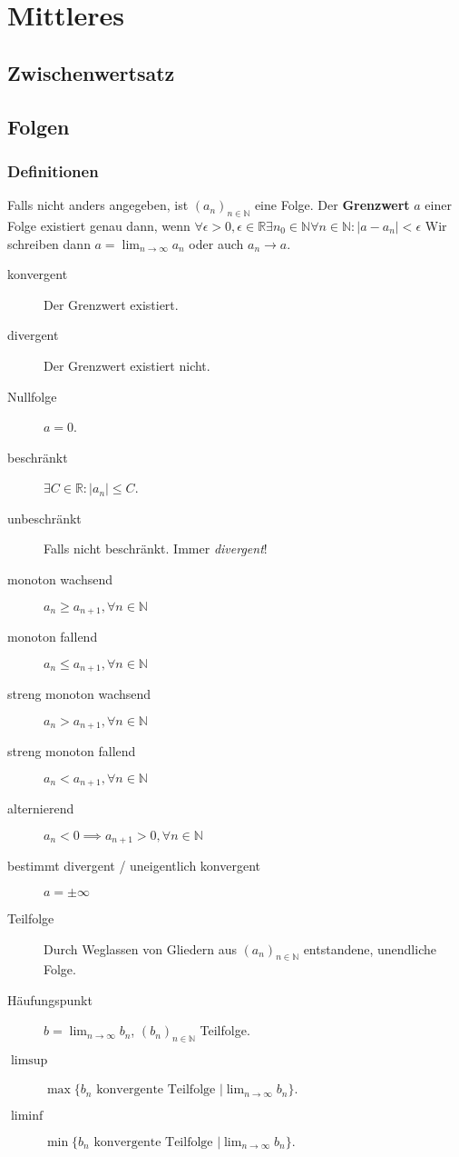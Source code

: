 \documentclass[a4paper, 9pt, DIV=24]{scrartcl}
\newcommand{\N}{\mathbb{N}}
\begin{document}
\clearpage
\section{Mittleres}

\subsection{Zwischenwertsatz}
\subsection{Folgen}
\subsubsection{Definitionen}
Falls nicht anders angegeben, ist $(a_n)_{n\in\N}$ eine Folge.
Der \textbf{Grenzwert} $a$ einer Folge existiert genau dann,
wenn $\forall \epsilon > 0, \epsilon\in\mathbb{R} \exists n_0 \in\N \forall n\in\N: |a - a_n| < \epsilon$
Wir schreiben dann $a = \lim_{n\rightarrow\infty} a_n$ oder auch $a_n \rightarrow a$.
\begin{description}
 \item[konvergent] Der Grenzwert existiert.
 \item[divergent] Der Grenzwert existiert nicht.
 \item[Nullfolge] $a = 0$.
 \item[beschränkt] $\exists C\in\mathbb{R}: |a_n| \leq C$.
 \item[unbeschränkt] Falls nicht beschränkt. Immer \emph{divergent}!
 \item[monoton wachsend] $a_n \geq a_{n+1}, \forall{n\in\N}$
 \item[monoton fallend] $a_n \leq a_{n+1}, \forall{n\in\N}$
 \item[streng monoton wachsend] $a_n > a_{n+1}, \forall{n\in\N}$
 \item[streng monoton fallend] $a_n < a_{n+1}, \forall{n\in\N}$
 \item[alternierend] $a_n < 0 \implies a_{n+1} > 0, \forall{n\in\N}$
 \item[bestimmt divergent / uneigentlich konvergent] $a = \pm \infty$
 \item[Teilfolge] Durch Weglassen von Gliedern aus $(a_n)_{n\in\N}$ entstandene, unendliche Folge.
 \item[Häufungspunkt] $b = \lim_{n\rightarrow\infty} b_n$, $(b_n)_{n\in\N}$ Teilfolge.
 \item[$\limsup$] $\max\{b_n\text{ konvergente Teilfolge } | \lim_{n\rightarrow\infty} b_n\}$.
 \item[$\liminf$] $\min\{b_n\text{ konvergente Teilfolge } | \lim_{n\rightarrow\infty} b_n\}$.
\end{description}
\end{document}
